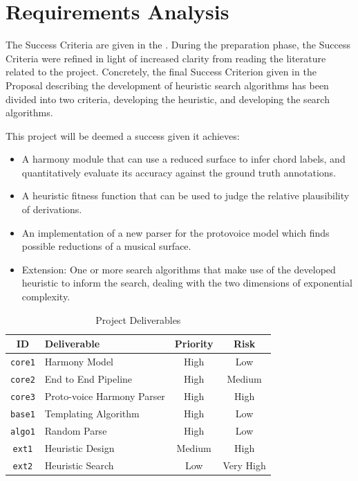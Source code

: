 \documentclass[12pt,a4paper,twoside,openany]{report} \usepackage[pdfborder={0 0 0}]{hyperref}    %
\theoremstyle{definition} \newtheorem{definition}{Definition}[section]
\begin{document}
\section{Requirements Analysis}
\label{sec:requirementsAnalysis}
The Success Criteria are given in the . During the preparation phase, the Success Criteria were
refined in light of increased clarity from reading the literature related to the project. Concretely, the final Success
Criterion given in the Proposal describing the development of heuristic search algorithms has been divided into two
criteria, developing the heuristic, and developing the search algorithms.

This project will be deemed a success given it achieves: 
\begin{itemize} 
  \item A harmony module that can use a reduced surface to infer chord labels, and quantitatively evaluate its accuracy against the ground truth annotations. 
  \item A heuristic fitness function that can be used to judge the relative plausibility of derivations. 
  \item An implementation of a new parser for the protovoice model which finds possible reductions of a musical surface. 
  \item Extension: One or more search algorithms that make use of the developed heuristic to inform the search, dealing with the two dimensions of exponential complexity. 
\end{itemize} 

\begin{table}[ht] \caption{Project Deliverables} 
  \vspace{\baselineskip} 
  \label{tab:deliverables} 
  \centering
  \begin{tabularx}{0.9\textwidth}{cXcc} 
    {\large \textbf{ID}} & \large \textbf{Deliverable} & \large \textbf{Priority} & \large \textbf{Risk} \\ 
    \toprule 
    \texttt{core1} & Harmony Model & High & Low \\ 
    \texttt{core2} & End to End Pipeline & High & Medium \\ 
    \texttt{core3} & Proto-voice Harmony Parser & High & High \\ 
    \texttt{base1} & Templating Algorithm & High & Low \\ 
    \texttt{algo1} & Random Parse & High & Low \\ 
    \texttt{ext1} & Heuristic Design & Medium & High \\
    \texttt{ext2} & Heuristic Search & Low & Very High \\
\end{tabularx} \end{table}
\end{document}

